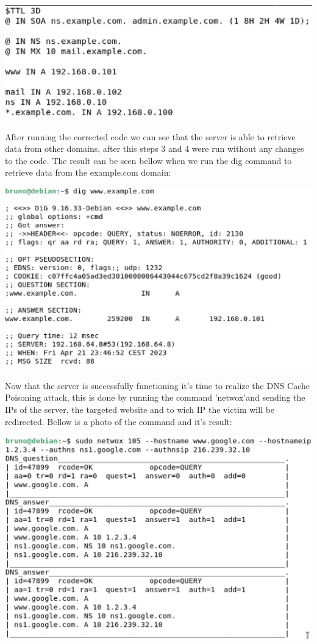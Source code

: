 \documentclass{article}
\begin{document}
\hbox{}

\includegraphics[scale=0.5]{images/bind-config-corrected.png}

\hbox{}

After running the corrected code we can see that the server is able to retrieve data from other domains, after this steps 3 and 4 were run without any changes to the code.
The result can be seen bellow when we run the dig command to retrieve data from the example.com domain:

\hbox{}

\includegraphics[scale=0.5]{images/dig-examplecom.png}

\hbox{}

Now that the server is successfully functioning it's time to realize the DNS Cache Poisoning attack, this is done by running the command 'netwox'and sending the IPs of the server, the targeted website and to wich IP the victim will be redirected.
Bellow is a photo of the command and it's result:

\hbox{}

\includegraphics[scale=0.5]{images/netwox-google.png}
\end{document}
